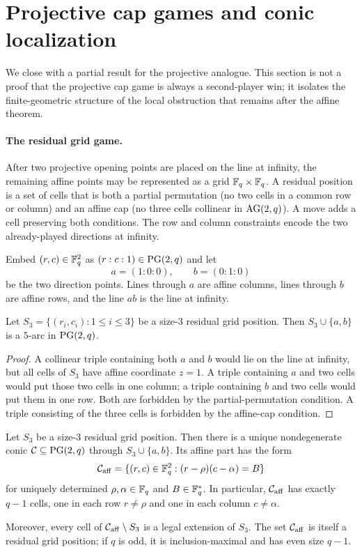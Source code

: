 \section{Projective cap games and conic localization}
\label{sec:conic-localization}

We close with a partial result for the projective analogue. This section is not a proof that
the projective cap game is always a second-player win; it isolates the finite-geometric
structure of the local obstruction that remains after the affine theorem.

\paragraph{The residual grid game.}
After two projective opening points are placed on the line at infinity, the remaining affine
points may be represented as a grid $\mathbb{F}_q\times\mathbb{F}_q$. A residual position is a set of cells
that is both a partial permutation (no two cells in a common row or column) and an affine cap
(no three cells collinear in $\mathrm{AG}(2,q)$). A move adds a cell preserving both conditions.
The row and column constraints encode the two already-played directions at infinity.

Embed $(r,c)\in\mathbb{F}_q^2$ as $(r:c:1)\in\mathrm{PG}(2,q)$ and let
\[
  a=(1:0:0),\qquad b=(0:1:0)
\]
be the two direction points. Lines through $a$ are affine columns, lines through $b$ are
affine rows, and the line $ab$ is the line at infinity.

\begin{lemma}
\label{lem:grid-five-arc}
Let $S_3=\{(r_i,c_i):1\leq i\leq 3\}$ be a size-$3$ residual grid position. Then
$S_3\cup\{a,b\}$ is a $5$-arc in $\mathrm{PG}(2,q)$.
\end{lemma}

\begin{proof}
A collinear triple containing both $a$ and $b$ would lie on the line at infinity, but all
cells of $S_3$ have affine coordinate $z=1$. A triple containing $a$ and two cells would
put those two cells in one column; a triple containing $b$ and two cells would put them in
one row. Both are forbidden by the partial-permutation condition. A triple consisting of
the three cells is forbidden by the affine-cap condition.
\end{proof}

\begin{theorem}
\label{thm:conic-localization}
Let $S_3$ be a size-$3$ residual grid position. Then there is a unique nondegenerate conic
$\mathcal C\subseteq\mathrm{PG}(2,q)$ through $S_3\cup\{a,b\}$. Its affine part has the form
\[
  \mathcal C_{\rm aff}
  =\{(r,c)\in\mathbb{F}_q^2:(r-\rho)(c-\alpha)=B\}
\]
for uniquely determined $\rho,\alpha\in\mathbb{F}_q$ and $B\in\mathbb{F}_q^\ast$. In particular,
$\mathcal C_{\rm aff}$ has exactly $q-1$ cells, one in each row $r\neq\rho$ and one in
each column $c\neq\alpha$.

Moreover, every cell of $\mathcal C_{\rm aff}\setminus S_3$ is a legal extension of
$S_3$. The set $\mathcal C_{\rm aff}$ is itself a residual grid position; if $q$ is odd,
it is inclusion-maximal and has even size $q-1$.
\end{theorem}

